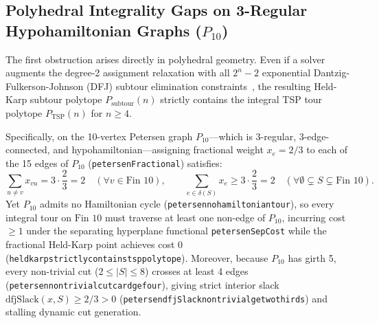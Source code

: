 \documentclass[11pt,a4paper]{article}
\renewcommand{\_}{\origunderscore\allowbreak}
\theoremstyle{plain}
\theoremstyle{definition}
\theoremstyle{remark}
\begin{document}
\subsection{Polyhedral Integrality Gaps on 3-Regular Hypohamiltonian Graphs (\texorpdfstring{$P_{10}$}{P10})}
The first obstruction arises directly in polyhedral geometry. Even if a solver augments the degree-2 assignment relaxation with all $2^n - 2$ exponential Dantzig-Fulkerson-Johnson (DFJ) subtour elimination constraints~\cite{dfj1954,hk1970}, the resulting Held-Karp subtour polytope $P_{\text{subtour}}(n)$ strictly contains the integral TSP tour polytope $P_{\text{TSP}}(n)$ for $n \ge 4$.

Specifically, on the 10-vertex Petersen graph $P_{10}$---which is 3-regular, 3-edge-connected, and hypohamiltonian---assigning fractional weight $x_e = 2/3$ to each of the 15 edges of $P_{10}$ (\texttt{petersenFractional}) satisfies:
\begin{equation}
  \sum_{u \ne v} x_{vu} = 3 \cdot \frac{2}{3} = 2 \quad (\forall v \in \text{Fin } 10), \qquad \sum_{e \in \delta(S)} x_e \ge 3 \cdot \frac{2}{3} = 2 \quad (\forall \emptyset \subsetneq S \subsetneq \text{Fin } 10).
\end{equation}
Yet $P_{10}$ admits no Hamiltonian cycle (\texttt{petersen\_no\_hamiltonian\_tour}), so every integral tour on $\text{Fin } 10$ must traverse at least one non-edge of $P_{10}$, incurring cost $\ge 1$ under the separating hyperplane functional \texttt{petersenSepCost} while the fractional Held-Karp point achieves cost $0$ (\texttt{held\_karp\_strictly\_contains\_tsp\_polytope}). Moreover, because $P_{10}$ has girth 5, every non-trivial cut ($2 \le |S| \le 8$) crosses at least 4 edges (\texttt{petersen\_nontrivial\_cut\_card\_ge\_four}), giving strict interior slack $\text{dfjSlack}(x, S) \ge 2/3 > 0$ (\texttt{petersen\_dfjSlack\_nontrivial\_ge\_two\_thirds}) and stalling dynamic cut generation.
\end{document}
